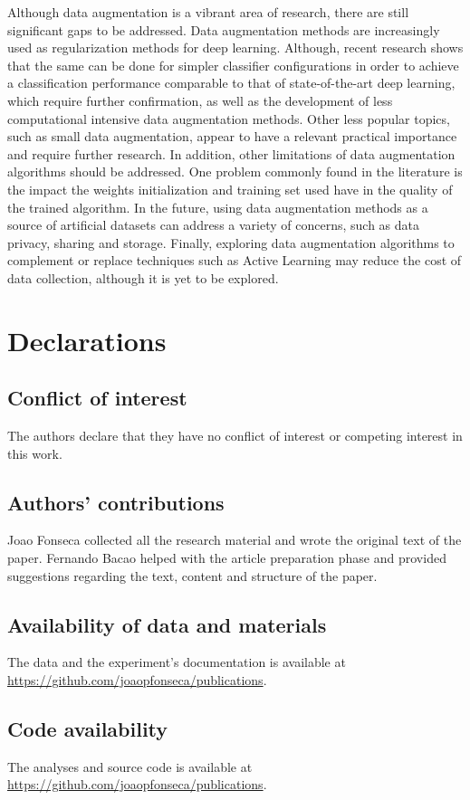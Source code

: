 \documentclass[parskip=full]{scrartcl}
\begin{document}
Although data augmentation is a vibrant area of research, there are still
significant gaps to be addressed. Data augmentation methods are increasingly
used as regularization methods for deep learning. Although, recent research
shows that the same can be done for simpler classifier configurations in order
to achieve a classification performance comparable to that of state-of-the-art
deep learning, which require further confirmation, as well as the development
of less computational intensive data augmentation methods. Other less popular
topics, such as small data augmentation, appear to have a relevant practical
importance and require further research. In addition, other limitations of
data augmentation algorithms should be addressed. One problem commonly found
in the literature is the impact the weights initialization and training set
used have in the quality of the trained algorithm. In the future, using data
augmentation methods as a source of artificial datasets can address a variety
of concerns, such as data privacy, sharing and storage. Finally, exploring
data augmentation algorithms to complement or replace techniques such as
Active Learning may reduce the cost of data collection, although it is yet to
be explored.

\section*{Declarations}

\subsection*{Conflict of interest}

The authors declare that they have no conflict of interest or competing interest in
this work.

\subsection*{Authors' contributions}

Joao Fonseca collected all the research material and wrote the original text
of the paper. Fernando Bacao helped with the article preparation phase and
provided suggestions regarding the text, content and structure of the paper.

\subsection*{Availability of data and materials}

The data and the experiment's documentation is available at
\href{https://github.com/joaopfonseca/publications}{https://github.com/joaopfonseca/publications}.

\subsection*{Code availability}

The analyses and source code is available at
\href{https://github.com/joaopfonseca/publications}{https://github.com/joaopfonseca/publications}.



\end{document}
